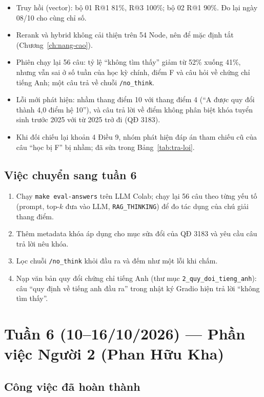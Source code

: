 \begin{itemize}
  \item Truy hồi (vector): bộ 01 R@1 81\%, R@3 100\%; bộ 02 R@1 90\%. Đo lại ngày 08/10 cho cùng chỉ số.
  \item Rerank và hybrid không cải thiện trên 54 Node, nên để mặc định tắt (Chương~\ref{ch:nang-cao}).
  \item Phiên chạy lại 56 câu: tỷ lệ ``không tìm thấy'' giảm từ 52\% xuống 41\%, nhưng vẫn sai ở số tuần
        của học kỳ chính, điểm F và câu hỏi về chứng chỉ tiếng Anh; một câu trả về chuỗi \texttt{/no\_think}.
  \item Lỗi mới phát hiện: nhầm thang điểm 10 với thang điểm 4 (``A được quy đổi thành 4,0 điểm hệ 10''),
        và câu trả lời về điểm không phân biệt khóa tuyển sinh trước 2025 với từ 2025 trở đi (QĐ 3183).
  \item Khi đối chiếu lại khoản 4 Điều 9, nhóm phát hiện đáp án tham chiếu cũ của câu ``học bị F'' bị
        nhầm; đã sửa trong Bảng~\ref{tab:tra-loi}.
\end{itemize}

\subsection{Việc chuyển sang tuần 6}

\begin{enumerate}
  \item Chạy \texttt{make eval-answers} trên LLM Colab; chạy lại 56 câu theo từng yếu tố (prompt, top-$k$
        đưa vào LLM, \texttt{RAG\_THINKING}) để đo tác dụng của chú giải thang điểm.
  \item Thêm metadata khóa áp dụng cho mục sửa đổi của QĐ 3183 và yêu cầu câu trả lời nêu khóa.
  \item Lọc chuỗi \texttt{/no\_think} khỏi đầu ra và đếm như một lỗi khi chấm.
  \item Nạp văn bản quy đổi chứng chỉ tiếng Anh (thư mục \texttt{2\_quy\_doi\_tieng\_anh}): câu ``quy định
        về tiếng anh đầu ra'' trong nhật ký Gradio hiện trả lời ``không tìm thấy''.
\end{enumerate}

\section{Tuần 6 (10--16/10/2026) --- Phần việc Người 2 (Phan Hữu Kha)}

\subsection{Công việc đã hoàn thành}

